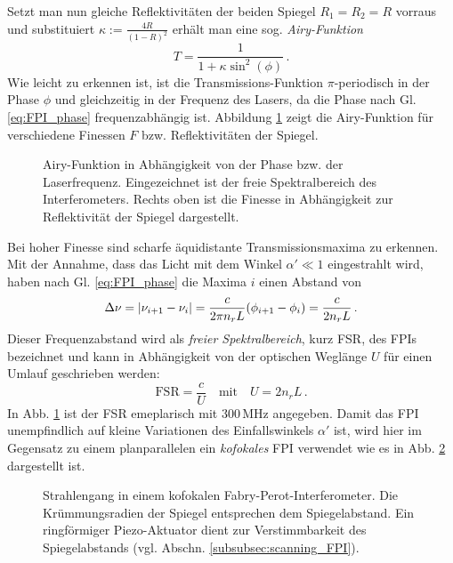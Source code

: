 Setzt man nun gleiche Reflektivitäten der beiden Spiegel $R_1=R_2=R$ vorraus und
substituiert $\kappa:=\frac{4R}{(1-R)^2}$ erhält man eine sog.
\textit{Airy-Funktion}
\begin{equation}\label{eq:FPI_airy-funktion}
	T=\frac{1}{1+\kappa\sin^2{(\phi)}}\,.
\end{equation}
Wie leicht zu erkennen ist, ist die Transmissions-Funktion $\pi$-periodisch in
der Phase $\phi$ und gleichzeitig in der Frequenz des Lasers, da die Phase nach
Gl. \eqref{eq:FPI_phase} frequenzabhängig ist. Abbildung
\ref{fig:airy-funktion} zeigt die Airy-Funktion für verschiedene Finessen
$F$ bzw. Reflektivitäten der Spiegel.
\begin{figure}[h]
	\centering
	\footnotesize
	
	\caption[Airy-Funktion]{Airy-Funktion
	in Abhängigkeit von der Phase bzw.
	der Laserfrequenz. Eingezeichnet ist
	der freie Spektralbereich des
	Interferometers. Rechts oben ist die
	Finesse in Abhängigkeit zur
	Reflektivität der Spiegel dargestellt.}\label{fig:airy-funktion}
\end{figure}
Bei hoher Finesse sind scharfe
äquidistante Transmissionsmaxima zu erkennen. Mit der Annahme, dass das Licht
mit dem Winkel $\alpha'\ll1$ eingestrahlt wird, haben nach Gl.
\eqref{eq:FPI_phase} die Maxima $i$ einen Abstand von
\begin{equation}\label{eq:FPI_transmissionsmaxima}
	\Delta\nu=\left|\nu_{i+1}-\nu_i\right|=\frac{c}{2\pi	n_rL}(\phi_{i+1}-\phi_i)=\frac{c}{2n_rL}\,.
\end{equation}
Dieser Frequenzabstand wird als \textit{freier Spektralbereich}, kurz FSR, des
FPIs bezeichnet und kann in Abhängigkeit von der optischen Weglänge $U$ für
einen Umlauf geschrieben werden:
\begin{equation}\label{eq:FPI_FSR_01}
	\text{FSR}=\frac{c}{U}
	\quad\text{mit}\quad
	U=2n_rL\,.
\end{equation}
In Abb. \ref{fig:airy-funktion} ist der FSR emeplarisch mit $300\,$MHz
angegeben. Damit das FPI unempfindlich auf kleine Variationen des Einfallswinkels $\alpha'$
ist, wird hier im Gegensatz zu einem planparallelen ein \textit{kofokales} FPI
verwendet wie es in Abb. \ref{fig:FPI_kofokal} dargestellt ist.
\begin{figure}[h]
 	\centering
	\caption[FPI - kofokal]{Strahlengang in einem
	kofokalen Fabry-Perot-Interferometer. Die
	Krümmungsradien der Spiegel entsprechen dem
	Spiegelabstand. Ein ringförmiger Piezo-Aktuator dient zur
	Verstimmbarkeit des Spiegelabstands (vgl. Abschn.
	\ref{subsubsec:scanning_FPI}).}\label{fig:FPI_kofokal}
\end{figure}
